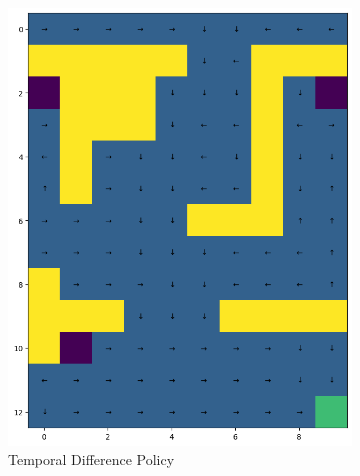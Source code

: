 \begin{figure}[H]
    \centering
    \begin{subfigure}[b]{0.4\textwidth}
        \centering
        \includegraphics[width=\textwidth]{assets/td/td_policy.png}        
        \caption{Temporal Difference Policy}
    \end{subfigure}
    \hfill 
    \begin{subfigure}[b]{0.4\textwidth}
        \centering

\end{subfigure}
\end{figure}
